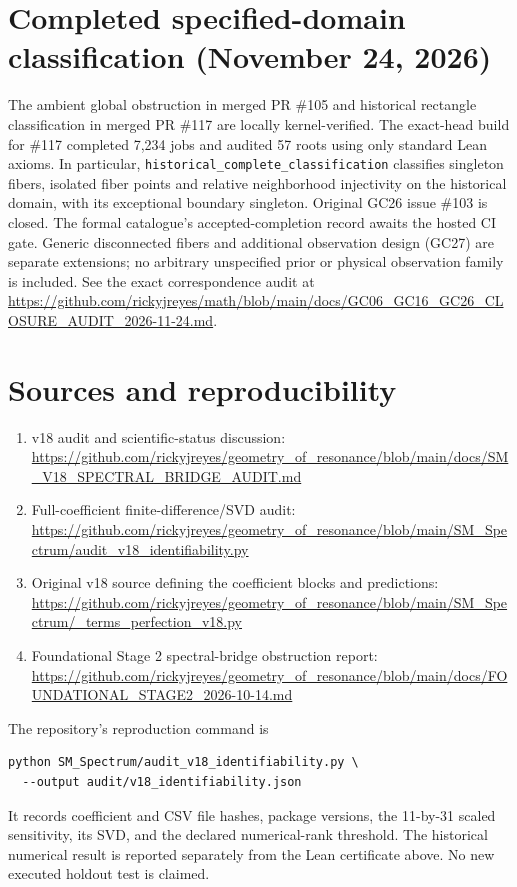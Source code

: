 \documentclass[11pt]{article}
\begin{document}
\section*{Completed specified-domain classification (November 24, 2026)}
The ambient global obstruction in merged PR \#105 and historical
rectangle classification in merged PR \#117 are locally kernel-verified.
The exact-head build for \#117 completed 7,234 jobs and audited 57 roots
using only standard Lean axioms. In particular,
\texttt{historical\_complete\_classification} classifies singleton fibers,
isolated fiber points and relative neighborhood injectivity on the
historical domain, with its exceptional boundary singleton. Original
GC26 issue \#103 is closed. The formal catalogue's accepted-completion
record awaits the hosted CI gate. Generic disconnected fibers and
additional observation design (GC27) are separate extensions; no
arbitrary unspecified prior or physical observation family is included.
See the exact correspondence audit at
\url{https://github.com/rickyjreyes/math/blob/main/docs/GC06_GC16_GC26_CLOSURE_AUDIT_2026-11-24.md}.

\section*{Sources and reproducibility}
\begin{enumerate}
\item v18 audit and scientific-status discussion:\\
\url{https://github.com/rickyjreyes/geometry_of_resonance/blob/main/docs/SM_V18_SPECTRAL_BRIDGE_AUDIT.md}
\item Full-coefficient finite-difference/SVD audit:\\
\url{https://github.com/rickyjreyes/geometry_of_resonance/blob/main/SM_Spectrum/audit_v18_identifiability.py}
\item Original v18 source defining the coefficient blocks and predictions:\\
\url{https://github.com/rickyjreyes/geometry_of_resonance/blob/main/SM_Spectrum/_terms_perfection_v18.py}
\item Foundational Stage 2 spectral-bridge obstruction report:\\
\url{https://github.com/rickyjreyes/geometry_of_resonance/blob/main/docs/FOUNDATIONAL_STAGE2_2026-10-14.md}
\end{enumerate}

\noindent The repository's reproduction command is
\begin{verbatim}
python SM_Spectrum/audit_v18_identifiability.py \
  --output audit/v18_identifiability.json
\end{verbatim}
It records coefficient and CSV file hashes, package versions, the
11-by-31 scaled sensitivity, its SVD, and the declared numerical-rank
threshold. The historical numerical result is reported separately from the Lean
certificate above. No new executed holdout test is claimed.
\end{document}

